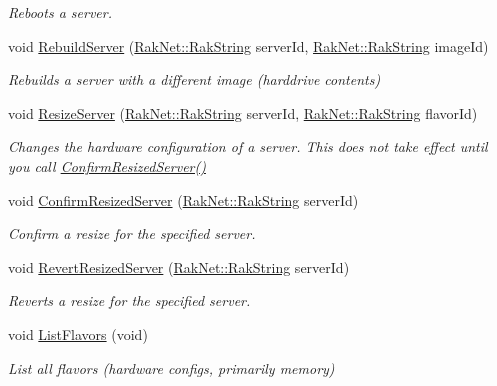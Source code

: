 \begin{DoxyCompactItemize}
\begin{DoxyCompactList}\small\item\em Reboots a server. \end{DoxyCompactList}\item 
void \hyperlink{class_rak_net_1_1_rackspace_a98b922f8490bc06fd245d9e18a3106a5}{Rebuild\-Server} (\hyperlink{class_rak_net_1_1_rak_string}{Rak\-Net\-::\-Rak\-String} server\-Id, \hyperlink{class_rak_net_1_1_rak_string}{Rak\-Net\-::\-Rak\-String} image\-Id)
\begin{DoxyCompactList}\small\item\em Rebuilds a server with a different image (harddrive contents) \end{DoxyCompactList}\item 
void \hyperlink{class_rak_net_1_1_rackspace_a1fa543b08cb603d054341d0b4c1a5eaa}{Resize\-Server} (\hyperlink{class_rak_net_1_1_rak_string}{Rak\-Net\-::\-Rak\-String} server\-Id, \hyperlink{class_rak_net_1_1_rak_string}{Rak\-Net\-::\-Rak\-String} flavor\-Id)
\begin{DoxyCompactList}\small\item\em Changes the hardware configuration of a server. This does not take effect until you call \hyperlink{class_rak_net_1_1_rackspace_aadf705ac8ae049f680c29e9b446bba37}{Confirm\-Resized\-Server()} \end{DoxyCompactList}\item 
void \hyperlink{class_rak_net_1_1_rackspace_aadf705ac8ae049f680c29e9b446bba37}{Confirm\-Resized\-Server} (\hyperlink{class_rak_net_1_1_rak_string}{Rak\-Net\-::\-Rak\-String} server\-Id)
\begin{DoxyCompactList}\small\item\em Confirm a resize for the specified server. \end{DoxyCompactList}\item 
void \hyperlink{class_rak_net_1_1_rackspace_af4c0a5ebf46b7db29b0816efe529fc87}{Revert\-Resized\-Server} (\hyperlink{class_rak_net_1_1_rak_string}{Rak\-Net\-::\-Rak\-String} server\-Id)
\begin{DoxyCompactList}\small\item\em Reverts a resize for the specified server. \end{DoxyCompactList}\item 
void \hyperlink{class_rak_net_1_1_rackspace_a9214e75866cb1dab1595cfa896213472}{List\-Flavors} (void)
\begin{DoxyCompactList}\small\item\em List all flavors (hardware configs, primarily memory) \end{DoxyCompactList}\item 

\end{DoxyCompactItemize}
